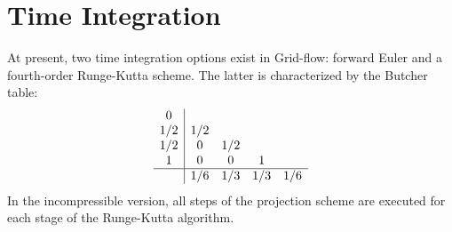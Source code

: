 \documentclass[11pt, a4paper, oneside, openany]{book}
\begin{document}
\section{Time Integration}\label{Chapter_Solver_Section_Time_Integration}
At present, two time integration options exist in Grid-flow: forward Euler and a fourth-order Runge-Kutta scheme. The latter is characterized by the Butcher table: %
\begin{equation}
\begin{array}{c|cccc}
0 &  &  &  & \\
1 / 2 & 1 / 2 &  &  & \\
1 / 2 & 0 & 1 / 2 &  & \\
1 & 0 & 0 & 1 & \\
\hline
 & 1 / 6 & 1 / 3 & 1 / 3 & 1 / 6
\end{array}\label{RK4_Butcher}
\end{equation}
In the incompressible version, all steps of the projection scheme are executed for each stage of the Runge-Kutta algorithm.
\end{document}
